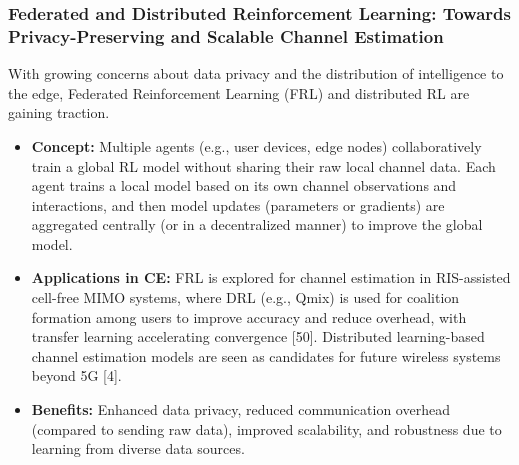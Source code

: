 \documentclass[journal,twocolumn]{IEEEtran}
\begin{document}
\subsubsection{Federated and Distributed Reinforcement Learning: Towards Privacy-Preserving and Scalable Channel Estimation}
With growing concerns about data privacy and the distribution of intelligence to the edge, Federated Reinforcement Learning (FRL) and distributed RL are gaining traction.
\begin{itemize}
    \item \textbf{Concept:} Multiple agents (e.g., user devices, edge nodes) collaboratively train a global RL model without sharing their raw local channel data. Each agent trains a local model based on its own channel observations and interactions, and then model updates (parameters or gradients) are aggregated centrally (or in a decentralized manner) to improve the global model.
    \item \textbf{Applications in CE:} FRL is explored for channel estimation in RIS-assisted cell-free MIMO systems, where DRL (e.g., Qmix) is used for coalition formation among users to improve accuracy and reduce overhead, with transfer learning accelerating convergence [50]. Distributed learning-based channel estimation models are seen as candidates for future wireless systems beyond 5G [4].
    \item \textbf{Benefits:} Enhanced data privacy, reduced communication overhead (compared to sending raw data), improved scalability, and robustness due to learning from diverse data sources.
\end{itemize}
\end{document}
